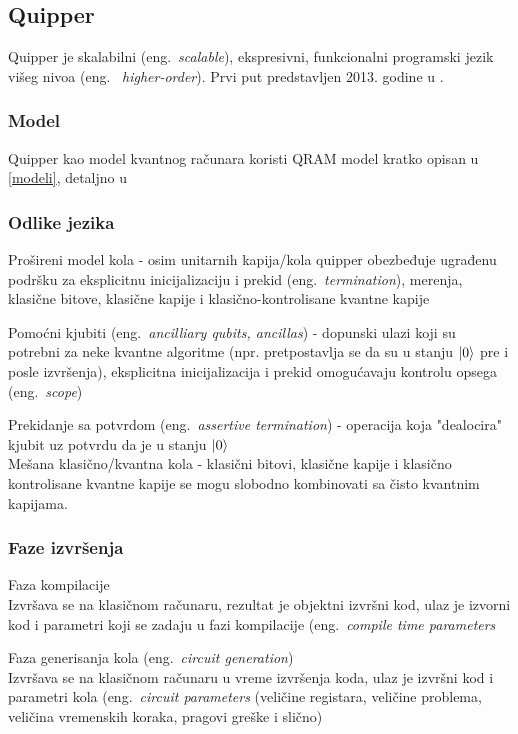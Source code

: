 \documentclass[a4paper]{article}
\begin{document}
{\subsection{Quipper}
\label{sec:quipper}

Quipper je skalabilni (eng.~\emph{scalable}), ekspresivni, funkcionalni programski jezik višeg nivoa (eng.~ \emph{higher-order}).
Prvi put predstavljen 2013. godine u \cite{quipper_language}.

\subsubsection{Model}

Quipper kao model kvantnog računara koristi QRAM model kratko opisan u \ref{modeli}, detaljno u \cite{qram_model} 


\subsubsection{Odlike jezika}

Prošireni model kola - osim unitarnih kapija/kola quipper obezbeđuje ugrađenu podršku za eksplicitnu inicijalizaciju i prekid (eng.~\emph{termination}), merenja, klasične bitove, klasične kapije i klasično-kontrolisane kvantne kapije 

Pomoćni kjubiti (eng.~\emph{ancilliary qubits, ancillas}) - dopunski ulazi koji su potrebni za neke kvantne algoritme (npr. pretpostavlja se da su u stanju $\ket{0}$ pre i posle izvršenja), eksplicitna inicijalizacija i prekid omogućavaju kontrolu opsega (eng.~\emph{scope})

Prekidanje sa potvrdom (eng.~\emph{assertive termination}) - operacija koja "dealocira" kjubit uz potvrdu da je u stanju $\ket{0}$\\

Mešana klasično/kvantna kola - klasični bitovi, klasične kapije i klasično kontrolisane kvantne kapije se mogu slobodno kombinovati sa čisto kvantnim kapijama.

\subsubsection{Faze izvršenja}

Faza kompilacije\\
Izvršava se na klasičnom računaru, rezultat je objektni izvršni kod, ulaz je izvorni kod i parametri koji se zadaju u fazi kompilacije (eng.~\emph{compile time parameters}

Faza generisanja kola (eng.~\emph{circuit generation})\\
Izvršava se na klasičnom računaru u vreme izvršenja koda, ulaz je izvršni kod i parametri kola (eng.~\emph{circuit parameters} (veličine registara, veličine problema, veličina vremenskih koraka, pragovi greške i slično)

}
\end{document}

